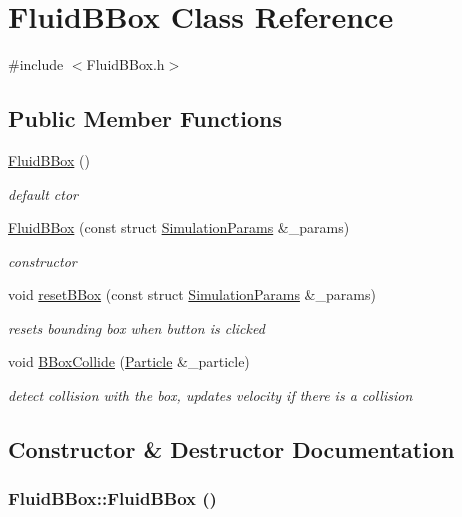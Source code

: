 \hypertarget{classFluidBBox}{
\section{FluidBBox Class Reference}
\label{classFluidBBox}
}


{\ttfamily \#include $<$FluidBBox.h$>$}\subsection*{Public Member Functions}
\begin{DoxyCompactItemize}
\item 
\hyperlink{classFluidBBox_a6f5e309c5ac43a251aca7145c0864c66}{FluidBBox} ()
\begin{DoxyCompactList}\small\item\em default ctor \item\end{DoxyCompactList}\item 
\hyperlink{classFluidBBox_a7309a16e038c8798d2f2ac1242e84e15}{FluidBBox} (const struct \hyperlink{structSimulationParams}{SimulationParams} \&\_\-params)
\begin{DoxyCompactList}\small\item\em constructor \item\end{DoxyCompactList}\item 
void \hyperlink{classFluidBBox_a48770a0ee9a759fed5d77182a95c7fc5}{resetBBox} (const struct \hyperlink{structSimulationParams}{SimulationParams} \&\_\-params)
\begin{DoxyCompactList}\small\item\em resets bounding box when button is clicked \item\end{DoxyCompactList}\item 
void \hyperlink{classFluidBBox_ae7da91cd968abc970301bec976db30d7}{BBoxCollide} (\hyperlink{classParticle}{Particle} \&\_\-particle)
\begin{DoxyCompactList}\small\item\em detect collision with the box, updates velocity if there is a collision \item\end{DoxyCompactList}\end{DoxyCompactItemize}


\subsection{Constructor \& Destructor Documentation}
\hypertarget{classFluidBBox_a6f5e309c5ac43a251aca7145c0864c66}{
\subsubsection[{FluidBBox}]{\setlength{\rightskip}{0pt plus 5cm}FluidBBox::FluidBBox ()}}
\label{classFluidBBox_a6f5e309c5ac43a251aca7145c0864c66}


